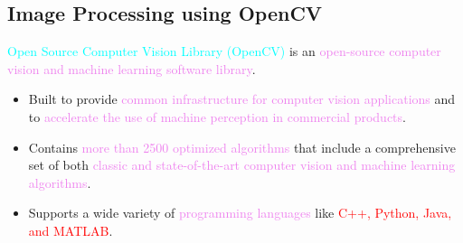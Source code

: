 \documentclass{book}
\begin{document}
\subsection{Image Processing using OpenCV}
\textcolor{cyan}{Open Source Computer Vision Library (OpenCV)} is an \textcolor{violet}{open-source computer vision and machine learning software library}.\\
\begin{itemize}
    \item Built to provide \textcolor{violet}{common infrastructure for computer vision applications} and to \textcolor{violet}{accelerate the use of machine perception in commercial products}.
    \item Contains \textcolor{violet}{more than 2500 optimized algorithms} that include a comprehensive set of both \textcolor{violet}{classic and state-of-the-art computer vision and machine learning algorithms}.
    \item Supports a wide variety of \textcolor{violet}{programming languages} like \textcolor{red}{C++, Python, Java, and MATLAB}.
\end{itemize}
\end{document}
